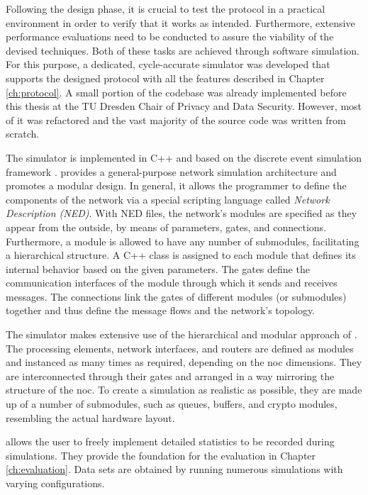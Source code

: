 Following the design phase, it is crucial to test the protocol in a practical environment in order to verify that it works as intended. Furthermore,
extensive performance evaluations need to be conducted to assure the viability of the devised techniques. Both of these tasks are achieved through
software simulation. For this purpose, a dedicated, cycle-accurate simulator was developed that supports the designed protocol with all the
features described in Chapter \ref{ch:protocol}. A small portion of the codebase was already implemented before this thesis at the TU Dresden
Chair of Privacy and Data Security. However, most of it was refactored and the vast majority of the source code was written from scratch.

The simulator is implemented in C++ and based on the \textit{\omnet{}} discrete event simulation framework \cite{omnet}. \omnet{} provides a general-purpose
network simulation architecture and promotes a modular design. In general, it allows the programmer to define the components of the network via a
special scripting language called \textit{Network Description (NED)}. With NED files, the network's modules are specified as they appear from the
outside, by means of parameters,
gates, and connections. Furthermore, a module is allowed to have any number of submodules, facilitating a hierarchical structure. A C++
class is assigned to each module that defines its internal behavior based on the given parameters. The gates define the communication interfaces of the
module through which it sends and receives messages. The connections link the gates of different modules (or submodules) together and thus define the
message flows and the network's topology.

The simulator makes extensive use of the hierarchical and modular approach of \omnet{}. The processing elements, network interfaces, and routers are
defined as modules and instanced as many times as required, depending on the \gls{noc} dimensions. They are interconnected through their gates and
arranged in a way mirroring the structure of the \gls{noc}. To create a simulation as realistic as possible, they are made up of a number of
submodules, such as queues, buffers, and crypto modules, resembling the actual hardware layout.

\omnet{} allows the user to freely implement detailed statistics to be recorded during simulations. They provide the foundation for the evaluation
in Chapter \ref{ch:evaluation}. Data sets are obtained by running numerous simulations with varying configurations.

